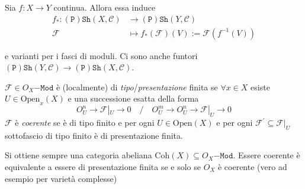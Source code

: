 \begin{remark}{}
    Sia \(f : X \to Y\) continua. Allora essa induce 
    \begin{align*}
        f_*: \mathtt{(P)Sh}{(X, \mathcal{C})} &\longrightarrow
        \mathtt{(P)Sh}{(Y, \mathcal{C})} \\
        \mathcal{F} &\longmapsto f_*(\mathcal{F}){(V)} := \mathcal{F}{(f^{-1}{(V)})}
    \end{align*}

    e varianti per i fasci di moduli. Ci sono anche funtori \(\mathtt{(P)Sh}{(Y,
    \mathcal{C})} \to \mathtt{(P)Sh}{(X, \mathcal{C})}\).
\end{remark}

\begin{definition}{}
    \(\mathcal{F} \in O_X\mathtt{-Mod}\) è (localmente) di
    \emph{tipo}/\emph{presentazione}
    finita se \(\forall x \in X\) esiste \(U \in \mathrm{Open}_x{(X)}\) e una
    successione esatta della forma 
    \[
      O_U^{n} \to \mathcal{F}|_U \to 0 \quad / \quad O_U^{m} \to O_U^{n} \to
      \mathcal{F}|_U \to 0
    \]
    \(\mathcal{F}\) è \emph{coerente} se è di tipo finito e per ogni \(U \in
    \mathrm{Open}{(X)}\) e per ogni \(\mathcal{F}^{\prime} \subseteq \mathcal{F}
    |_U\) sottofascio di tipo finito è di presentazione finita.

    Si ottiene sempre una categoria abeliana \(\mathrm{Coh}{(X)} \subseteq
    O_X\mathtt{-Mod}\). Essere coerente è equivalente a essere di presentazione
    finita se e solo se \(O_X\) è coerente (vero ad esempio per varietà
    complesse)
\end{definition}



